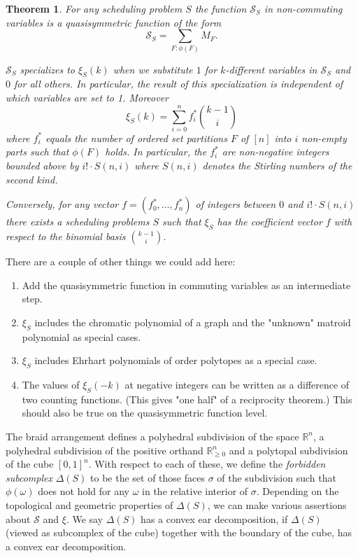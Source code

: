 \documentclass[12pt]{amsart}
\newtheorem{theorem}[definition]{Theorem}
\newcommand{\RR}{\mathbb{R}}
\newcommand{\SSS}{\mathcal{S}}
\begin{document}
\begin{theorem}
For any scheduling problem $S$ the function $\SSS_S$ in non-commuting variables is a quasisymmetric function of the form
\[
  \SSS_S = \sum_{F: \phi(F)} M_F.
\]

$\SSS_S$ specializes to $\xi_S(k)$ when we substitute $1$ for $k$-different variables in $\SSS_S$ and $0$ for all others. In particular, the result of this specialization is independent of which variables are set to 1. Moreover
\[
  \xi_S(k) = \sum_{i=0}^n f_i^* \binom{k-1}{i}
\]
where $f_i^*$ equals the number of ordered set partitions $F$ of $[n]$ into $i$ non-empty parts such that $\phi(F)$ holds. In particular, the $f_i^*$ are non-negative integers bounded above by $i!\cdot S(n,i)$ where $S(n,i)$ denotes the Stirling numbers of the second kind.

Conversely, for any vector $f=(f_0^*,\ldots,f_n^*)$ of integers between $0$ and $i!\cdot S(n,i)$ there exists a scheduling problems $S$ such that $\xi_S$ has the coefficient vector $f$ with respect to the binomial basis $\binom{k-1}{i}$.
\end{theorem}

There are a couple of other things we could add here:
\begin{enumerate}
\item Add the quasisymmetric function in commuting variables as an intermediate step.
\item $\xi_S$ includes the chromatic polynomial of a graph and the "unknown" matroid polynomial as special cases.
\item $\xi_S$ includes Ehrhart polynomials of order polytopes as a special case.
\item The values of $\xi_S(-k)$ at negative integers can be written as a difference of two counting functions. (This gives "one half" of a reciprocity theorem.) This should also be true on the quasisymmetric function level.
\end{enumerate}

The braid arrangement defines a polyhedral subdivision of the space $\RR^n$, a polyhedral subdivision of the positive orthand $\RR_{\geq 0}^n$ and a polytopal subdivision of the cube $[0,1]^n$. With respect to each of these, we define the \emph{forbidden subcomplex} $\Delta(S)$ to be the set of those faces $\sigma$ of the subdivision such that $\phi(\omega)$ does not hold for any $\omega$ in the relative interior of $\sigma$. Depending on the topological and geometric properties of $\Delta(S)$, we can make various assertions about $\SSS$ and $\xi$. We say $\Delta(S)$ has a convex ear decomposition, if $\Delta(S)$ (viewed as subcomplex of the cube) together with the boundary of the cube, has a convex ear decomposition.
\end{document}
